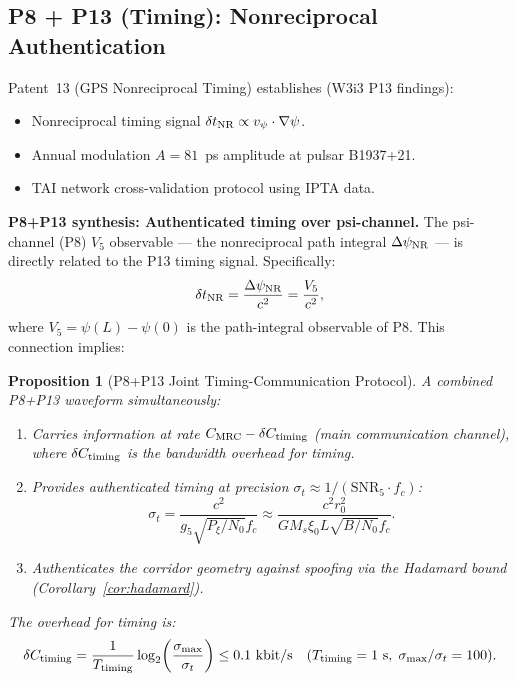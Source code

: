 \documentclass[aps,prd,twocolumn,superscriptaddress,nofootinbib]{revtex4-2}
\newcommand{\SNR}{\mathrm{SNR}}
\newtheorem{proposition}[theorem]{Proposition}
\begin{document}
\subsection{P8 + P13 (Timing): Nonreciprocal Authentication}

Patent~13 (GPS Nonreciprocal Timing) establishes (W3i3 P13 findings):
\begin{itemize}
\item Nonreciprocal timing signal $\delta t_{\rm NR} \propto v_\psi \cdot \nabla\psi$.
\item Annual modulation $A = 81$~ps amplitude at pulsar B1937+21.
\item TAI network cross-validation protocol using IPTA data.
\end{itemize}

\textbf{P8+P13 synthesis: Authenticated timing over psi-channel.}
The psi-channel (P8) $V_5$ observable --- the nonreciprocal path integral
$\Delta\psi_{\rm NR}$ --- is directly related to the P13 timing signal.
Specifically:
\begin{equation}
\delta t_{\rm NR} = \frac{\Delta\psi_{\rm NR}}{c^2} = \frac{V_5}{c^2},
\label{eq:timing-V5}
\end{equation}
where $V_5 = \psi(L) - \psi(0)$ is the path-integral observable of P8.
This connection implies:

\begin{proposition}[P8+P13 Joint Timing-Communication Protocol]
\label{prop:P8P13}
A combined P8+P13 waveform simultaneously:
\begin{enumerate}
\item Carries information at rate $C_{\rm MRC} - \delta C_{\rm timing}$
  (main communication channel), where $\delta C_{\rm timing}$ is the
  bandwidth overhead for timing.
\item Provides authenticated timing at precision $\sigma_t \approx 1/(\SNR_5 \cdot f_c)$:
  \begin{equation}
  \sigma_t = \frac{c^2}{g_5 \sqrt{P_\xi/N_0} f_c}
  \approx \frac{c^2 r_0^2}{G M_s \xi_0 L \sqrt{B/N_0} f_c}.
  \label{eq:sigma-timing}
  \end{equation}
\item Authenticates the corridor geometry against spoofing via the
  Hadamard bound (Corollary~\ref{cor:hadamard}).
\end{enumerate}
The overhead for timing is:
\begin{equation}
\delta C_{\rm timing} = \frac{1}{T_{\rm timing}} \log_2\!\left(\frac{\sigma_{\rm max}}{\sigma_t}\right)
\leq 0.1~\text{kbit/s} \quad (T_{\rm timing} = 1~\text{s},\; \sigma_{\rm max}/\sigma_t = 100).
\label{eq:timing-overhead}
\end{equation}
\end{proposition}
\end{document}
